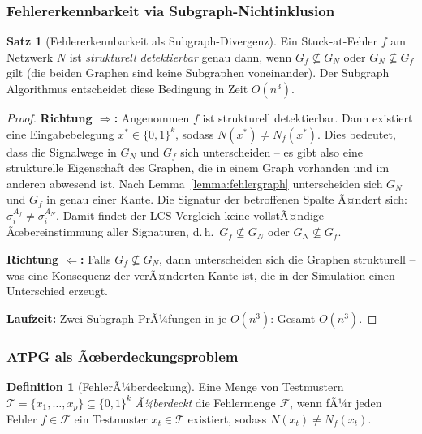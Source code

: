 ﻿\documentclass[a4paper,12pt]{article}
\theoremstyle{definition}
\newtheorem{definition}{Definition}
\newtheorem{satz}{Satz}
\begin{document}
\subsubsection{Fehlererkennbarkeit via Subgraph-Nichtinklusion}

\begin{satz}[Fehlererkennbarkeit als Subgraph-Divergenz]\label{satz:fehlerdetekt}
  Ein Stuck-at-Fehler $f$ am Netzwerk $N$ ist \emph{strukturell detektierbar} genau
  dann, wenn $G_f \not\subseteq G_N$ oder $G_N \not\subseteq G_f$ gilt
  (die beiden Graphen sind keine Subgraphen voneinander). Der Subgraph Algorithmus
  entscheidet diese Bedingung in Zeit $O(n^3)$.
\end{satz}

\begin{proof}
  \textbf{Richtung $\Rightarrow$:} Angenommen $f$ ist strukturell detektierbar.
  Dann existiert eine Eingabebelegung $x^* \in \{0,1\}^k$, sodass $N(x^*) \neq N_f(x^*)$.
  Dies bedeutet, dass die Signalwege in $G_N$ und $G_f$ sich unterscheiden -- es gibt
  also eine strukturelle Eigenschaft des Graphen, die in einem Graph vorhanden und im
  anderen abwesend ist. Nach Lemma~\ref{lemma:fehlergraph} unterscheiden sich $G_N$
  und $G_f$ in genau einer Kante. Die Signatur der betroffenen Spalte Ã¤ndert sich:
  $\sigma_i^{A_f} \neq \sigma_i^{A_N}$. Damit findet der LCS-Vergleich keine vollstÃ¤ndige
  Ãœbereinstimmung aller Signaturen, d.\,h.\ $G_f \not\subseteq G_N$ oder
  $G_N \not\subseteq G_f$.

  \textbf{Richtung $\Leftarrow$:} Falls $G_f \not\subseteq G_N$, dann unterscheiden
  sich die Graphen strukturell -- was eine Konsequenz der verÃ¤nderten Kante ist, die
  in der Simulation einen Unterschied erzeugt.

  \textbf{Laufzeit:} Zwei Subgraph-PrÃ¼fungen in je $O(n^3)$: Gesamt $O(n^3)$.
\end{proof}

\subsubsection{ATPG als Ãœberdeckungsproblem}

\begin{definition}[FehlerÃ¼berdeckung]\label{def:fehlerueberdeckung}
  Eine Menge von Testmustern $\mathcal{T} = \{x_1, \ldots, x_p\} \subseteq \{0,1\}^k$
  \emph{Ã¼berdeckt} die Fehlermenge $\mathcal{F}$, wenn fÃ¼r jeden Fehler
  $f \in \mathcal{F}$ ein Testmuster $x_t \in \mathcal{T}$ existiert, sodass
  $N(x_t) \neq N_f(x_t)$.
\end{definition}
\end{document}
